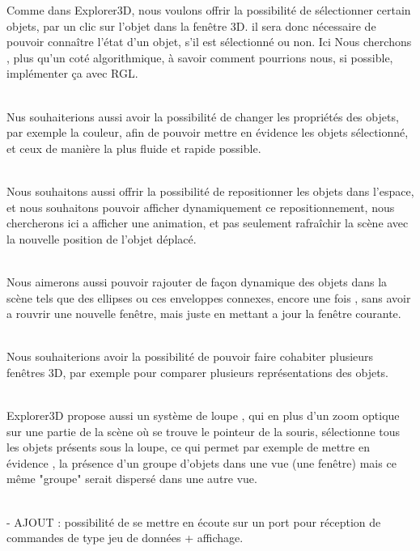 Comme dans Explorer3D, nous voulons offrir la possibilité de sélectionner certain objets, par un clic sur l'objet dans la fenêtre 3D. il sera donc nécessaire de pouvoir connaître l'état d'un objet, s’il est sélectionné ou non. Ici Nous cherchons , plus qu'un coté algorithmique, à savoir comment pourrions nous, si possible, implémenter ça avec RGL. 
\\\\\indent

Nus souhaiterions aussi avoir la possibilité de changer les propriétés des objets, par exemple la couleur, afin de pouvoir mettre en évidence les objets sélectionné, et ceux de manière la plus fluide et rapide possible.
\\\\\indent

Nous souhaitons aussi offrir la possibilité de repositionner les objets dans l'espace, et nous souhaitons pouvoir afficher dynamiquement ce repositionnement, nous chercherons ici a afficher une animation, et pas seulement rafraîchir la scène avec la nouvelle position de l'objet déplacé. 
\\\\\indent

Nous aimerons aussi pouvoir rajouter de façon dynamique des objets dans la scène tels que des ellipses ou ces enveloppes connexes, encore une fois , sans avoir a rouvrir une nouvelle fenêtre, mais juste en mettant a jour la fenêtre courante.
\\\\\indent

Nous souhaiterions avoir la possibilité de pouvoir faire cohabiter plusieurs fenêtres 3D,  par exemple pour comparer plusieurs représentations des objets.
\\\\\indent

Explorer3D propose aussi un système de loupe , qui en plus d'un zoom optique sur une partie de la scène où se trouve le pointeur de la souris, sélectionne tous les objets présents sous la loupe, ce qui permet par exemple de mettre en évidence , la présence d'un groupe d'objets dans une vue (une fenêtre) mais ce même "groupe" serait dispersé dans une autre vue.
\\\\\indent


- AJOUT : possibilité de se mettre en écoute sur un port pour réception de commandes de type jeu de données + affichage.

\newpage